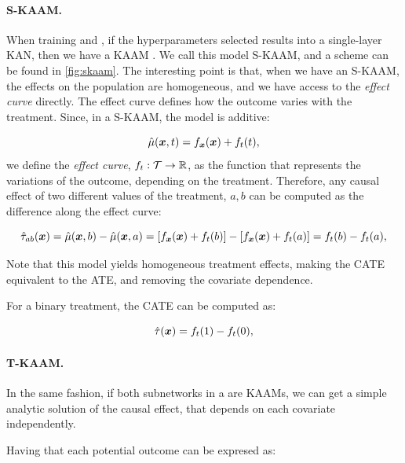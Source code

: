 \paragraph{S-KAAM.} When training and \skan, if the hyperparameters selected results into a single-layer KAN, then we have a KAAM \citep{pati25kaam}. We call this model S-KAAM, and a scheme can be found in \cref{fig:skaam}. The interesting point is that, when we have an S-KAAM, the effects on the population are homogeneous, and we have access to the \emph{effect curve} directly. The effect curve defines how the outcome varies with the treatment. Since, in a S-KAAM, the model is additive:

\begin{equation}
    \hpo(\samplecov, \sampletreati) = \func[\samplecov](\samplecov) + \func[\sampletreati](\sampletreati),
\end{equation}
we define the \emph{effect curve}, $\func[\sampletreati]: \treatmentspace \to \R$, as the function that represents the variations of the outcome, depending on the treatment. Therefore, any causal effect of two different values of the treatment, $a,b$ can be computed as the difference along the effect curve:

\begin{equation}
    \hat{\tau}_{ab}(\samplecov) = \hpo(\samplecov, b) -  \hpo(\samplecov, a)= [\func[\samplecov](\samplecov) + \func[\sampletreati](b)] - [\func[\samplecov](\samplecov) + \func[\sampletreati](a)] = \func[\sampletreati](b) - \func[\sampletreati](a),
\end{equation}

Note that this model yields homogeneous treatment effects, making the CATE equivalent to the ATE, and removing the covariate dependence.

For a binary treatment, the CATE can be computed as:

\begin{equation}
    \hat{\tau}(\samplecov) = \func[\sampletreati](1) - \func[\sampletreati](0),
    \label{eq:cate_skaam}
\end{equation}

\paragraph{T-KAAM.} In the same fashion, if both subnetworks in a \tkan are KAAMs, we can get a simple analytic solution of the causal effect, that depends on each covariate independently.

Having that each potential outcome can be expresed as:

